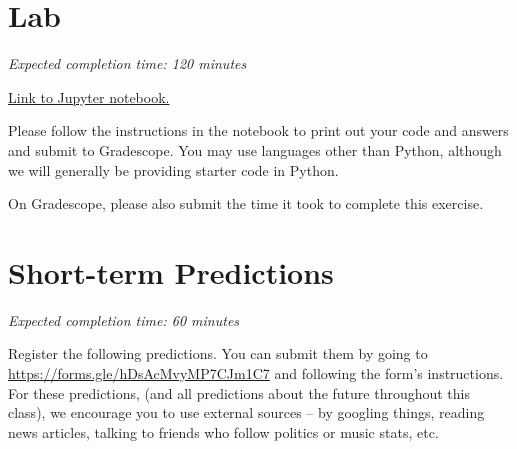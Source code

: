 \documentclass[11pt]{article}
\begin{document}
\section*{Lab}

\emph{Expected completion time: 120 minutes}

\href{https://bit.ly/34T4SlQ}{Link to Jupyter notebook.}

Please follow the instructions in the notebook to print out your code and answers and submit to Gradescope. You may use languages other than Python, although we will generally be providing starter code in Python.

On Gradescope, please also submit the time it took to complete this exercise.

\section*{Short-term Predictions}

\emph{Expected completion time: 60 minutes}

Register the following predictions. You can submit them by going to \url{https://forms.gle/hDsAcMvyMP7CJm1C7} and following the form's instructions. For these predictions, (and all predictions about the future throughout this class), we encourage you to use external sources -- by googling things, reading news articles, talking to friends who follow politics or music stats, etc.
\end{document}
